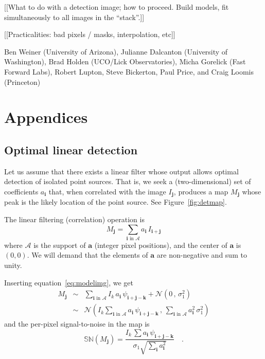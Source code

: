 \documentclass[letterpaper,preprint]{aastex62}
\newcommand{\equationname}{equation}
\newcommand{\eqnref}[1]{\mbox{\equationname~\ref{#1}}}
\newcommand{\figref}[1]{\mbox{Figure~\ref{#1}}}
\newcommand{\drawnfrom}{\sim}
\newcommand{\gaussianN}{\mathcal{N}}
\newcommand{\gaussx}[2]{\gaussianN\!\left(#1 \, , \, #2\right)}
\newcommand{\psf}{\psi}
\newcommand{\psfat}[1]{\psf_{#1}}
\newcommand{\signoise}{[S/N]}
\newcommand{\snr}[1]{\mathbb{SN}(#1)}
\renewcommand{\vec}[1]{\boldsymbol{#1}}
\newcommand{\avec}{\vec{a}}
\newcommand{\ivec}{\vec{i}}
\newcommand{\jvec}{\vec{j}}
\newcommand{\kvec}{\vec{k}}
\newcommand{\coord}[2]{(#1, #2)}
\newcommand{\iina}{\ivec \,\, \mathrm{in} \,\, \mathcal{A}}
\begin{document}
[[What to do with a detection image; how to proceed.  Build models,
    fit simultaneously to all images in the ``stack''.]]

[[Practicalities: bad pixels / masks, interpolation, etc]]

\acknowledgements

Ben Weiner (University of Arizona),
Julianne Dalcanton (University of Washington),
Brad Holden (UCO/Lick Observatories),
Micha Gorelick (Fast Forward Labs),
Robert Lupton, Steve Bickerton, Paul Price, and Craig Loomis (Princeton)


%





\appendix

\section{Appendices}

\subsection{Optimal linear detection}
\label{app:lindet}

Let us assume that there exists a linear filter whose output allows
optimal detection of isolated point sources.  That is, we seek a
(two-dimensional) set of coefficients $a_{\ivec}$ that, when
correlated with the image $I_{\jvec}$, produces a map $M_{\jvec}$
whose peak is the likely location of the point source.  See
\figref{fig:detmap}.


The linear filtering (correlation) operation is
\begin{equation}
M_{\jvec} = \sum_{\iina} a_{\ivec} \, I_{\ivec + \jvec}
\label{eq:detmap1}
\end{equation}
where $\mathcal{A}$ is the support of $\avec$ (integer pixel
positions), and the center of $\avec$ is $\coord{0}{0}$.  We will
demand that the elements of $\avec$ are non-negative and sum to unity.

Inserting \eqnref{eq:modelimg}, we get
\begin{eqnarray}
M_{\jvec} &\drawnfrom& \sum_{\iina}
  I_k \, a_{\ivec} \, \psfat{\ivec + \jvec - \kvec} + \gaussx{0}{\sigma_1^2}
  \\
&\drawnfrom& \gaussx{ I_k \sum_{\iina} a_{\ivec} \, \psfat{\ivec + \jvec - \kvec}}%
    {\sum_{\iina} a_{\ivec}^2 \, \sigma_1^2}
\end{eqnarray}
and the per-pixel signal-to-noise in the map is
\begin{equation}
  \snr{M_{\jvec}} = \frac{I_k \, \sum a_{\ivec} \, \psfat{\ivec + \jvec - \kvec}}{\sigma_1 \sqrt{\sum_{\ivec} a_{\ivec}^2}} \quad .
  \label{eq:detmapsn1}
\end{equation}
\end{document}
